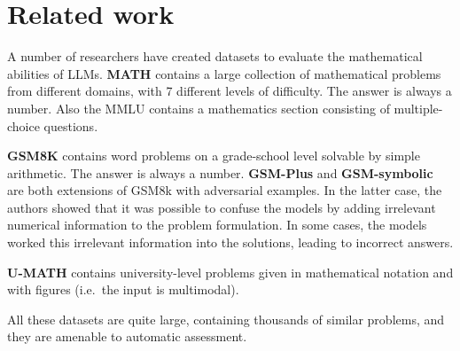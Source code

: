 \section{Related work}
A number of researchers have created datasets to evaluate the mathematical abilities of LLMs. {\bf MATH} \citep{hendrycks2021measuring} contains a large collection of mathematical problems from different domains, with 7 different levels of difficulty. The answer is always a number. Also the MMLU \citep{hendrycks2020measuring} contains a mathematics section consisting of multiple-choice questions.  

{\bf GSM8K} \citep{cobbe2021training} contains word problems on a grade-school level solvable by simple arithmetic. The answer is always a number. {\bf GSM-Plus} \citep{li2024gsm} and  {\bf GSM-symbolic} \citep{mirzadeh2024gsm} are both extensions of GSM8k with adversarial examples. In the latter case, the authors showed that it was possible to confuse the models by adding irrelevant numerical information to the problem formulation. In some cases, the models worked this irrelevant information into the solutions, leading to incorrect answers. 

{\bf U-MATH} \citep{chernyshev2024u} contains university-level problems given in mathematical notation and with figures (i.e.\ the input is multimodal). 

All these datasets are quite large, containing thousands of similar problems, and they are amenable to automatic assessment.